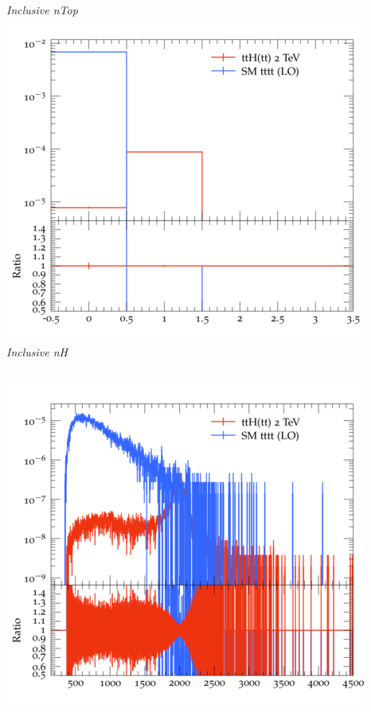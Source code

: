 \documentclass{beamer}
\begin{document}
\begin{frame}
\begin{columns}
\textit{\small Inclusive nTop}
\includegraphics[width=\textwidth]{../plots/ttH_2000/tttt_ttH/Inclusive_nH.png}\\
\textit{\small Inclusive nH}
\end{columns}
\begin{columns}
\includegraphics[width=\textwidth]{../plots/ttH_2000/tttt_ttH/Inclusive_InvM_ttbar12.png}\\

\end{columns}
\end{frame}
\end{document}
